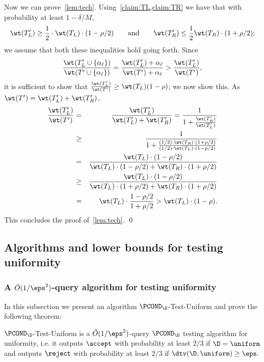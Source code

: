 Now we can prove~\cref{lem:tech}.  Using~\cref{claim:TL,claim:TR} we have that with probability at least
{ $1-\delta/M$,}
\[
\wt(T'_L) \geq {\frac{1}2} \cdot \wt(T_L) \cdot (1-\rho/2)
\quad \quad \text{and} \quad \quad
\wt(T'_R) \leq {\frac{1}2} \wt(T_R) \cdot (1 + \rho/2);
\]
we assume that both these inequalities hold going forth.  Since
\[
{\frac {\wt(T'_L \cup \{\alpha_\ell\})}
       {\wt(T' \cup \{\alpha_\ell\})}}
=
{\frac {\wt(T'_L) + \alpha_\ell}
       {\wt(T') + \alpha_\ell}}
>
{\frac {\wt(T'_L)}
       {\wt(T')}},
\]
it is sufficient to show that
$ {\frac {\wt(T'_L)} {\wt(T')}} \geq \wt(T_L) (1-\rho)$; we now show this.
As \mbox{$\wt(T')=\wt(T'_L)+\wt(T'_R)$},
\begin{eqnarray*}
{\frac {\wt(T'_L)} {\wt(T')}} &=&
{\frac {\wt(T'_L)} {\wt(T'_L) + \wt(T'_R)}} =
{\frac{1}{1 + {\frac {\wt(T'_R)}{\wt(T'_L)}}}}\\
&\geq&
{\frac{1}{1 + {\frac {(1/2)\cdot \wt(T_R) \cdot (1 + \rho/2)}
{(1/2) \cdot \wt(T_L) \cdot (1-\rho/2)}}}}\\
&=&
{\frac {\wt(T_L) \cdot (1 - \rho/2)}
 {\wt(T_L)\cdot (1-\rho/2) + \wt(T_R) \cdot (1 + \rho/2)}}\\
&\geq&
{\frac {\wt(T_L) \cdot (1 - \rho/2)}
 {\wt(T_L)\cdot (1+\rho/2) + \wt(T_R) \cdot (1 + \rho/2)}}\\
&=&
\wt(T_L) \cdot {\frac {1-\rho/2}{1+\rho/2}} > \wt(T_L) \cdot (1-\rho).
\end{eqnarray*}
This concludes the proof of~\cref{lem:tech}.
\qed
 
\subsection{Algorithms and lower bounds for testing uniformity}
\label{sec:uniform}

\subsubsection{A \texorpdfstring{$\tilde{O}(1/\eps^2)$}{O(1/eps2)}-query \PCOND algorithm for testing uniformity} \label{ssec:unif-alg}

In this subsection we present an algorithm {\sc $\PCOND_\D$-Test-Uniform}
and prove the following theorem:

\begin{theorem} \label{thm:paircond-test-uniform}
{\sc $\PCOND_\D$-Test-Uniform} is a $\tilde{O}(1/\eps^2)$-query $\PCOND_\D$
testing algorithm for uniformity, i.e. it outputs $\accept$ with probability
at least $2/3$ if $\D = \uniform$ and outputs $\reject$
with probability at least $2/3$ if $\dtv(\D,\uniform) \geq \eps.$
\end{theorem}

